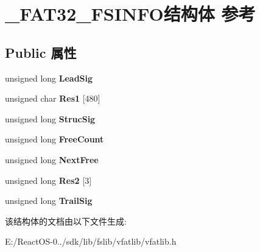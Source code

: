 \hypertarget{struct___f_a_t32___f_s_i_n_f_o}{}\section{\+\_\+\+F\+A\+T32\+\_\+\+F\+S\+I\+N\+F\+O结构体 参考}
\label{struct___f_a_t32___f_s_i_n_f_o}
\subsection*{Public 属性}
\begin{DoxyCompactItemize}
\item 
\mbox{\label{struct___f_a_t32___f_s_i_n_f_o_a2a7a3e5a01f0d0fcd8514d9e8de4c9bb}} 
unsigned long {\bfseries Lead\+Sig}
\item 
\mbox{\label{struct___f_a_t32___f_s_i_n_f_o_ab85875f64915e4b97ecc8021c148e971}} 
unsigned char {\bfseries Res1} \mbox{[}480\mbox{]}
\item 
\mbox{\label{struct___f_a_t32___f_s_i_n_f_o_a0b3fe55c9d39d19ed4f9f1a7beef52e0}} 
unsigned long {\bfseries Struc\+Sig}
\item 
\mbox{\label{struct___f_a_t32___f_s_i_n_f_o_a2821d3d55f414d0023f974bdba4ef4c4}} 
unsigned long {\bfseries Free\+Count}
\item 
\mbox{\label{struct___f_a_t32___f_s_i_n_f_o_a32d15605c413e5cab9a5c83cbde6f737}} 
unsigned long {\bfseries Next\+Free}
\item 
\mbox{\label{struct___f_a_t32___f_s_i_n_f_o_afa90e337135d31859393b1011ddd2fc9}} 
unsigned long {\bfseries Res2} \mbox{[}3\mbox{]}
\item 
\mbox{\label{struct___f_a_t32___f_s_i_n_f_o_ae4dd5feeef8c781e2a3d6f960b5f77b4}} 
unsigned long {\bfseries Trail\+Sig}
\end{DoxyCompactItemize}


该结构体的文档由以下文件生成\+:\begin{DoxyCompactItemize}
\item 
E\+:/\+React\+O\+S-\/0../sdk/lib/fslib/vfatlib/vfatlib.\+h\end{DoxyCompactItemize}
